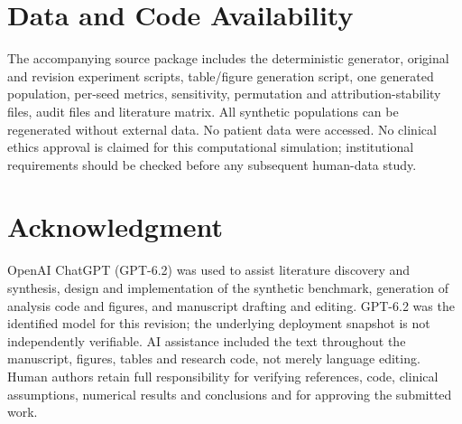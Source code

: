 \documentclass[conference]{IEEEtran}
\begin{document}
\section*{Data and Code Availability}
The accompanying source package includes the deterministic generator, original and revision experiment scripts, table/figure generation script, one generated population, per-seed metrics, sensitivity, permutation and attribution-stability files, audit files and literature matrix. All synthetic populations can be regenerated without external data. No patient data were accessed. No clinical ethics approval is claimed for this computational simulation; institutional requirements should be checked before any subsequent human-data study.
\section*{Acknowledgment}
OpenAI ChatGPT (GPT-6.2) was used to assist literature discovery and synthesis, design and implementation of the synthetic benchmark, generation of analysis code and figures, and manuscript drafting and editing. GPT-6.2 was the identified model for this revision; the underlying deployment snapshot is not independently verifiable. AI assistance included the text throughout the manuscript, figures, tables and research code, not merely language editing. Human authors retain full responsibility for verifying references, code, clinical assumptions, numerical results and conclusions and for approving the submitted work.
\end{document}
